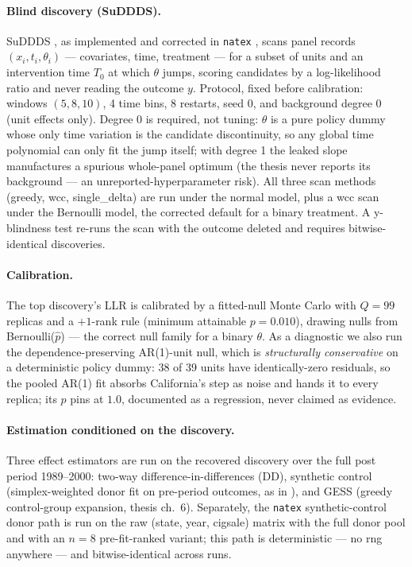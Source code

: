 \documentclass[11pt]{article}
\newcommand{\natex}{\texttt{natex}}
\begin{document}
\paragraph{Blind discovery (SuDDDS).} SuDDDS \cite{herlands2020}, as
implemented and corrected in \natex{} \cite{natex}, scans panel records
$(x_i, t_i, \theta_i)$ --- covariates, time, treatment --- for a subset of
units and an intervention time $T_0$ at which $\theta$ jumps, scoring
candidates by a log-likelihood ratio and never reading the outcome $y$.
Protocol, fixed before calibration: windows $(5, 8, 10)$, 4 time bins, 8
restarts, seed 0, and background degree 0 (unit effects only). Degree 0 is
required, not tuning: $\theta$ is a pure policy dummy whose only time
variation is the candidate discontinuity, so any global time polynomial can
only fit the jump itself; with degree 1 the leaked slope manufactures a
spurious whole-panel optimum (the thesis never reports its background --- an
unreported-hyperparameter risk). All three scan methods (greedy, wcc,
single\_delta) are run under the normal model, plus a wcc scan under the
Bernoulli model, the corrected default for a binary treatment. A y-blindness
test re-runs the scan with the outcome deleted and requires bitwise-identical
discoveries.

\paragraph{Calibration.} The top discovery's LLR is calibrated by a
fitted-null Monte Carlo with $Q = 99$ replicas and a $+1$-rank rule (minimum
attainable $p = 0.010$), drawing nulls from Bernoulli($\hat p$) --- the
correct null family for a binary $\theta$. As a diagnostic we also run the
dependence-preserving AR(1)-unit null, which is \emph{structurally
conservative} on a deterministic policy dummy: 38 of 39 units have
identically-zero residuals, so the pooled AR(1) fit absorbs California's step
as noise and hands it to every replica; its $p$ pins at $1.0$, documented as
a regression, never claimed as evidence.

\paragraph{Estimation conditioned on the discovery.} Three effect estimators
are run on the recovered discovery over the full post period 1989--2000:
two-way difference-in-differences (DD), synthetic control (simplex-weighted
donor fit on pre-period outcomes, as in \cite{abadie2010}), and GESS (greedy
control-group expansion, thesis ch.~6). Separately, the \natex{}
synthetic-control donor path is run on the raw (state, year, cigsale) matrix
with the full donor pool and with an $n=8$ pre-fit-ranked variant; this path
is deterministic --- no rng anywhere --- and bitwise-identical across runs.
\end{document}
